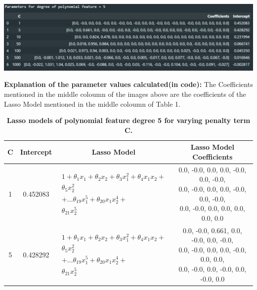 \documentclass[10pt]{article}
\begin{document}
\begin{center}
  \includegraphics[scale=0.4]{./images/Table_5.png}
\end{center}

\textbf{Explanation of the parameter values calculated(in code):}
The Coefficients mentioned in the middle coloumn of the images above are the coefficients of the Lasso Model mentioned in the middle coloumn of Table 1.
\begin{table}[H]
  \begin{center}
    \caption{\textbf{Lasso models of polynomial feature degree 5 for varying penalty term C.} }
    \begin{tabular}{ |c|c|c|c| }
      \hline
      C    & Intercept & Lasso Model                                                                                                                                                                                                                                        & Lasso Model Coefficients                                \\
      \hline
      1    & 0.452083  & $\begin{aligned}1 + \theta_{1}x_{1} + \theta_{2}x_{2} + \theta_{3}x_{1}^{2}+ \theta_{4}x_{1}x_{2}+\\\nonumber \theta_{5}x_{2}^{2}\\\nonumber+\dots \theta_{19}x_{1}^{5}+ \theta_{20}x_{1}x_{2}^{4}+ \\\nonumber \theta_{21}x_{2}^{5}\end{aligned}$ & \makecell{0.0, -0.0, 0.0, 0.0, -0.0, 0.0, -0.0,         \\0.0, -0.0, 0.0, 0.0, -0.0, 0.0, -0.0, \\0.0, -0.0, 0.0, 0.0, 0.0, 0.0, 0.0} \\
      \hline
      5    & 0.428292  & $\begin{aligned}1 + \theta_{1}x_{1} + \theta_{2}x_{2} + \theta_{3}x_{1}^{2}+ \theta_{4}x_{1}x_{2}+\\\nonumber \theta_{5}x_{2}^{2}\\\nonumber+\dots \theta_{19}x_{1}^{5}+ \theta_{20}x_{1}x_{2}^{4}+ \\\nonumber \theta_{21}x_{2}^{5}\end{aligned}$ & \makecell{0.0, -0.0, 0.661, 0.0, -0.0, 0.0, -0.0,       \\0.0, -0.0, 0.0, 0.0, -0.0, 0.0, 0.0, \\0.0, -0.0, 0.0, -0.0, 0.0, -0.0, 0.0} \\

\end{tabular}
\end{center}
\end{table}
\end{document}
